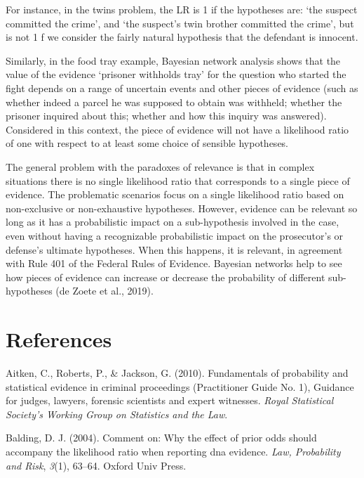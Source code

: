 \documentclass[10pt,dvipsnames,enabledeprecatedfontcommands]{scrartcl}
\begin{document}
For instance, in the twins problem, the LR is 1 if the hypotheses are:
`the suspect committed the crime', and `the suspect's twin brother
committed the crime', but is not 1 f we consider the fairly natural
hypothesis that the defendant is innocent.

Similarly, in the food tray example, Bayesian network analysis shows
that the value of the evidence `prisoner withholds tray' for the
question who started the fight depends on a range of uncertain events
and other pieces of evidence (such as whether indeed a parcel he was
supposed to obtain was withheld; whether the prisoner inquired about
this; whether and how this inquiry was answered). Considered in this
context, the piece of evidence will not have a likelihood ratio of one
with respect to at least some choice of sensible hypotheses.

The general problem with the paradoxes of relevance is that in complex
situations there is no single likelihood ratio that corresponds to a
single piece of evidence. The problematic scenarios focus on a single
likelihood ratio based on non-exclusive or non-exhaustive hypotheses.
However, evidence can be relevant so long as it has a probabilistic
impact on a sub-hypothesis involved in the case, even without having a
recognizable probabilistic impact on the prosecutor's or defense's
ultimate hypotheses. When this happens, it is relevant, in agreement
with Rule 401 of the Federal Rules of Evidence. Bayesian networks help
to see how pieces of evidence can increase or decrease the probability
of different sub-hypotheses (de Zoete et al., 2019).

\hypertarget{references}{%
\section*{References}\label{references}}

\hypertarget{refs}{}
\leavevmode\hypertarget{ref-aitken2010fundamentals}{}%
Aitken, C., Roberts, P., \& Jackson, G. (2010). Fundamentals of
probability and statistical evidence in criminal proceedings
(Practitioner Guide No. 1), Guidance for judges, lawyers, forensic
scientists and expert witnesses. \emph{Royal Statistical Society's
Working Group on Statistics and the Law}.

\leavevmode\hypertarget{ref-balding2004comment}{}%
Balding, D. J. (2004). Comment on: Why the effect of prior odds should
accompany the likelihood ratio when reporting dna evidence. \emph{Law,
Probability and Risk}, \emph{3}(1), 63--64. Oxford Univ Press.
\end{document}

